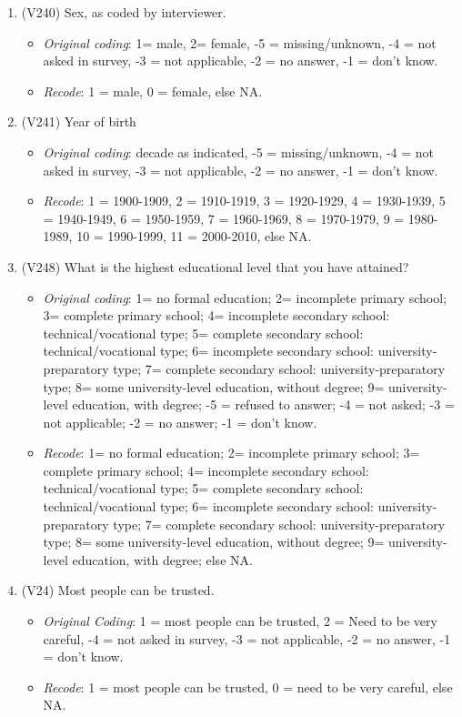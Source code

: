 \documentclass[]{article}
\begin{document}
\begin{enumerate}
  \item (V240) Sex, as coded by interviewer.
  \begin{itemize}
  \item \textit{Original coding}: 1= male, 2= female, -5 = missing/unknown, -4 = not asked in survey, -3 = not applicable, -2 = no answer, -1 = don't know. 
  \item \textit{Recode}: 1 = male, 0 = female, else NA.
  \end{itemize}
  \item (V241) Year of birth
  \begin{itemize}
  \item \textit{Original coding}: decade as indicated, -5 = missing/unknown, -4 = not asked in survey, -3 = not applicable, -2 = no answer, -1 = don't know.
  \item \textit{Recode}: 1 = 1900-1909, 2 = 1910-1919, 3 = 1920-1929, 4 = 1930-1939, 5 = 1940-1949, 6 = 1950-1959, 7 = 1960-1969, 8 = 1970-1979, 9 = 1980-1989, 10 = 1990-1999, 11 = 2000-2010, else NA.
  \end{itemize}
  \item (V248) What is the highest educational level that you have attained?
  \begin{itemize}
  \item \textit{Original coding}: 1= no formal education; 2= incomplete primary school; 3= complete primary school; 4= incomplete secondary school: technical/vocational type; 5= complete secondary school: technical/vocational type; 6= incomplete secondary school: university-preparatory type; 7= complete secondary school: university-preparatory type; 8= some university-level education, without degree; 9= university-level education, with degree; -5 = refused to answer; -4 = not asked; -3 = not applicable; -2 = no answer; -1 = don't know.
  \item \textit{Recode}: 1= no formal education; 2= incomplete primary school; 3= complete primary school; 4= incomplete secondary school: technical/vocational type; 5= complete secondary school: technical/vocational type; 6= incomplete secondary school: university-preparatory type; 7= complete secondary school: university-preparatory type; 8= some university-level education, without degree; 9= university-level education, with degree; else NA.
  \end{itemize}
  \item (V24) Most people can be trusted.
  \begin{itemize}
  \item \textit{Original Coding}: 1 = most people can be trusted, 2 = Need to be very careful, -4 = not asked in survey, -3 = not applicable, -2 = no answer, -1 = don't know.
  \item \textit{Recode}: 1 = most people can be trusted, 0 = need to be very careful, else NA.
  \end{itemize}
\end{enumerate}
\end{document}
